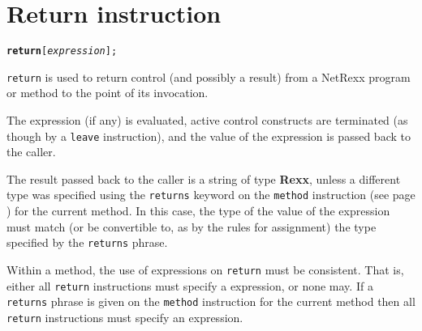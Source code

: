 \chapter{Return instruction}\label{"id"}
\begin{shaded}
\begin{alltt}
\textbf{return} [\emph{expression}];
\end{alltt}
\end{shaded}
 \texttt{return} is used to return control (and possibly a result)
from a NetRexx program or method to the point of its invocation.
 
The expression (if any) is evaluated, active control constructs are
terminated (as though by a \texttt{leave} instruction), and the value of
the expression is passed back to the caller.
 
The result passed back to the caller is a string of type \textbf{Rexx},
unless a different type was specified using the \texttt{returns} keyword
on the  \texttt{method} instruction (see page \pageref{refmethod})  for the current
method.
In this case, the type of the value of the expression must match (or be
convertible to, as by the rules for assignment) the type specified by
the \texttt{returns} phrase.
 
Within a method, the use of expressions on \texttt{return} must be
consistent.  That is, either all \texttt{return} instructions must
specify a expression, or none may.
If a \texttt{returns} phrase is given on the \texttt{method} instruction
for the current method then all \texttt{return} instructions must
specify an expression.
